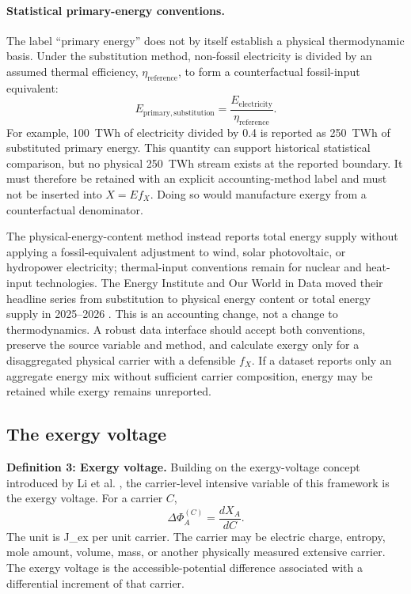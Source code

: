 \documentclass[11pt]{article}
\newcommand{\XA}{X_A}
\begin{document}
\paragraph{Statistical primary-energy conventions.} The label ``primary energy'' does not by itself establish a physical thermodynamic basis. Under the substitution method, non-fossil electricity is divided by an assumed thermal efficiency, $\eta_{\mathrm{reference}}$, to form a counterfactual fossil-input equivalent:
\begin{equation}
E_{\mathrm{primary,substitution}}=\frac{E_{\mathrm{electricity}}}{\eta_{\mathrm{reference}}}.
\end{equation}
For example, 100~TWh of electricity divided by 0.4 is reported as 250~TWh of substituted primary energy. This quantity can support historical statistical comparison, but no physical 250~TWh stream exists at the reported boundary. It must therefore be retained with an explicit accounting-method label and must not be inserted into $X=Ef_X$. Doing so would manufacture exergy from a counterfactual denominator.

The physical-energy-content method instead reports total energy supply without applying a fossil-equivalent adjustment to wind, solar photovoltaic, or hydropower electricity; thermal-input conventions remain for nuclear and heat-input technologies. The Energy Institute and Our World in Data moved their headline series from substitution to physical energy content or total energy supply in 2025--2026 \cite{owidprimary2026}. This is an accounting change, not a change to thermodynamics. A robust data interface should accept both conventions, preserve the source variable and method, and calculate exergy only for a disaggregated physical carrier with a defensible $f_X$. If a dataset reports only an aggregate energy mix without sufficient carrier composition, energy may be retained while exergy remains unreported.

\subsection{The exergy voltage}

\textbf{Definition 3: Exergy voltage.} Building on the exergy-voltage concept introduced by Li et al. \cite{li2022}, the carrier-level intensive variable of this framework is the exergy voltage. For a carrier $C$,
\begin{equation}
\Delta\Phi_A^{(C)}=\frac{d\XA}{dC}.
\end{equation}
The unit is J\_ex per unit carrier. The carrier may be electric charge, entropy, mole amount, volume, mass, or another physically measured extensive carrier. The exergy voltage is the accessible-potential difference associated with a differential increment of that carrier.
\end{document}
